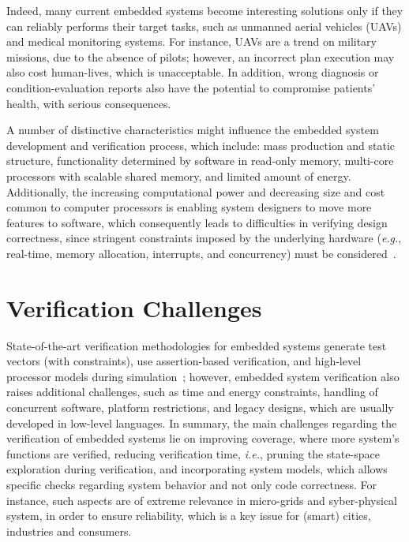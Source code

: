 \documentclass{acm_sen_article}
\begin{document}
Indeed, many current embedded systems become interesting solutions only if they can reliably
performs their target tasks, such as unmanned aerial vehicles (UAVs) and medical monitoring systems. For instance, UAVs are a trend on military missions, due to the absence of pilots; however, an incorrect plan execution may also cost human-lives, which is unacceptable. In addition, wrong diagnosis or condition-evaluation reports also have the potential to compromise patients' health, with serious consequences.


A number of distinctive characteristics might influence the embedded system development and verification process, which include: mass production and static structure, functionality determined by software in read-only memory, multi-core processors with scalable shared memory, and limited amount of energy. Additionally, the increasing computational power and decreasing size and cost common to computer processors is enabling system designers to move more features to software, which consequently leads to difficulties in verifying design correctness, since stringent constraints imposed by the underlying hardware ({\it e.g.}, real-time, memory allocation, interrupts, and concurrency) must be considered~\cite{Kroening15}.

\section{Verification Challenges}

State-of-the-art verification methodologies for embedded systems generate test vectors (with constraints), use assertion-based verification, and high-level processor models during simulation~\cite{Behrend15,Lettnin09}; however, embedded system verification also raises additional challenges, such as time and energy constraints, handling of concurrent software, platform restrictions, and legacy designs, which are usually developed in low-level languages. In summary, the main challenges regarding the verification of embedded systems lie on improving coverage, where more system's functions are verified, reducing verification time, {\it i.e.}, pruning the state-space exploration during verification, and incorporating system models, which allows specific checks regarding system behavior and not only code correctness. For instance, such aspects are of extreme relevance in micro-grids and syber-physical system, in order to ensure reliability, which is a key issue for (smart) cities, industries and consumers.
\end{document}
